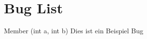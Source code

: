 \chapter{Bug List}
\hypertarget{bug}{}\label{bug}

\begin{DoxyRefList}
\item[Member \doxylink{class_bruch_a13fc58380d9e596c1d9e8c71a99965d2}{Bruch\+::ggt} (int a, int b)]\label{bug__bug000001}%
%
Dies ist ein Beispiel Bug
\end{DoxyRefList}